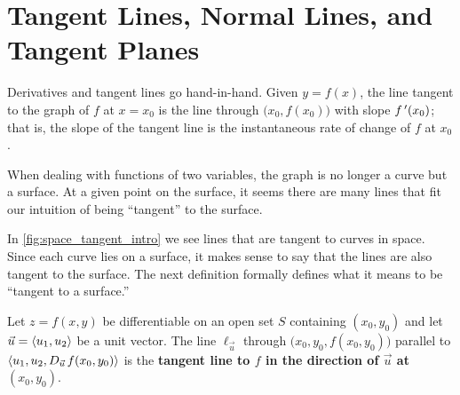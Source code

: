 \section[Tangent Lines, Normal Lines, and Tangent Planes]{\!Tangent Lines, Normal Lines, and Tangent Planes}\label{sec:multi_tangent}

Derivatives and tangent lines go hand-in-hand. Given $y=f(x)$, the line tangent to the graph of $f$ at $x=x_0$ is the line through $\bigl(x_0,f(x_0)\bigr) $ with slope $f\,'(x_0)$; that is, the slope of the tangent line is the instantaneous rate of change of $f$ at $x_0$. 

When dealing with functions of two variables, the graph is no longer a curve but a surface. At a given point on the surface, it seems there are many lines that fit our intuition of being ``tangent'' to the surface. 


In \autoref{fig:space_tangent_intro} we see lines that are tangent to curves in space. Since each curve lies on a  surface, it makes sense to say that the lines are also tangent to the surface. The next definition formally defines what it means to be ``tangent to a surface.'' %

\begin{definition}\label{def:directional_tangent_line}%
Let $z=f(x,y)$ be differentiable on an open set $S$ containing $(x_0,y_0)$ and let $\vec u =\left\langle u_1, u_2\right\rangle$ be a unit vector.
%	
%	
The line $\ell_{\vec u}$ through $\bigl(x_0,y_0,f(x_0,y_0)\bigr)$ parallel to $\left\langle u_1,u_2,D_{\vec u\,}f(x_0,y_0)\right\rangle$ is the \textbf{tangent line to $f$ in the direction of $\vec u$ at $(x_0,y_0)$}.
\end{definition}

